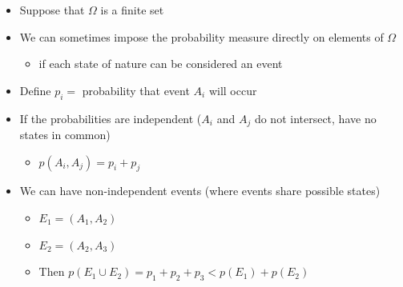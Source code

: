 \documentclass[notes=show]{beamer}
\begin{document}
\begin{frame}%


\begin{itemize}
\item Suppose that $\Omega $ is a finite set

\item We can sometimes impose the probability measure directly on elements
of $\Omega $

\begin{itemize}
\item if each state of nature can be considered an event
\end{itemize}

\item Define $p_{i}=$ probability that event $A_{i}$ will occur

\item If the probabilities are independent ($A_{i}$ and $A_{j}$ do not
intersect, have no states in common)

\begin{itemize}
\item $p\left( A_{i},A_{j}\right) =p_{i}+p_{j}$
\end{itemize}

\item We can have non-independent events (where events share possible states)

\begin{itemize}
\item $E_{1}=\left( A_{1},A_{2}\right) $

\item $E_{2}=\left( A_{2},A_{3}\right) $

\item Then $p(E_{1}\cup E_{2})=p_{1}+p_{2}+p_{3}<p(E_{1})+p(E_{2})$
\end{itemize}
\end{itemize}

\end{frame}%
\end{document}
